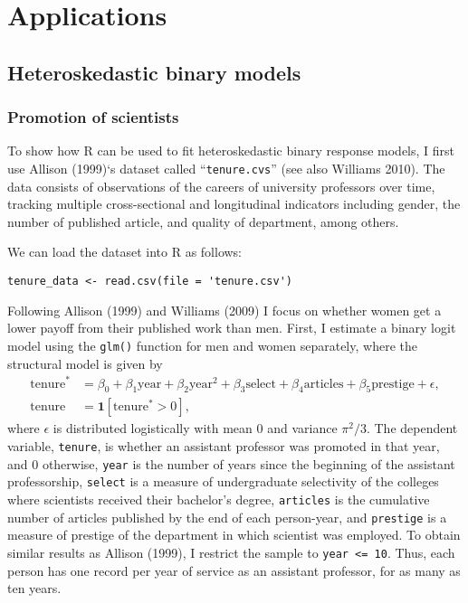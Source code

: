 \hypertarget{applications}{%
\section{Applications}\label{applications}}

\hypertarget{heteroskedastic-binary-models}{%
\subsection{Heteroskedastic binary models}\label{heteroskedastic-binary-models}}

\hypertarget{promotion-of-scientists}{%
\subsubsection{Promotion of scientists}\label{promotion-of-scientists}}

To show how R can be used to fit heteroskedastic binary response models, I first use Allison (1999)`s dataset called ``\texttt{tenure.cvs}'' (see also Williams 2010). The data consists of observations of the careers of university professors over time, tracking multiple cross-sectional and longitudinal indicators including gender, the number of published article, and quality of department, among others.

We can load the dataset into R as follows:

\begin{verbatim}
tenure_data <- read.csv(file = 'tenure.csv')
\end{verbatim}

Following Allison (1999) and Williams (2009) I focus on whether women get a lower payoff from their published work than men. First, I estimate a binary logit model using the \texttt{glm()} function for men and women separately, where the structural model is given by
\begin{equation*}
\begin{aligned}
  \text{tenure}^* &= \beta_0 + \beta_1\text{year} + \beta_2 \text{year}^2 + \beta_3\text{select}+\beta_4\text{articles}+\beta_5 \text{prestige} + \epsilon, \\
  \text{tenure} & = \mathbf{1}\left[\text{tenure}^* > 0\right],   
\end{aligned}
\end{equation*}
where \(\epsilon\) is distributed logistically with mean 0 and variance \(\pi^2/3\). The dependent variable, \texttt{tenure}, is whether an assistant professor was promoted in that year, and 0 otherwise, \texttt{year} is the number of years since the beginning of the assistant professorship, \texttt{select} is a measure of undergraduate selectivity of the colleges where scientists received their bachelor's degree, \texttt{articles} is the cumulative number of articles published by the end of each person-year, and \texttt{prestige} is a measure of prestige of the department in which scientist was employed. To obtain similar results as Allison (1999), I restrict the sample to \texttt{year\ \textless{}=\ 10}. Thus, each person has one record per year of service as an assistant professor, for as many as ten years.

